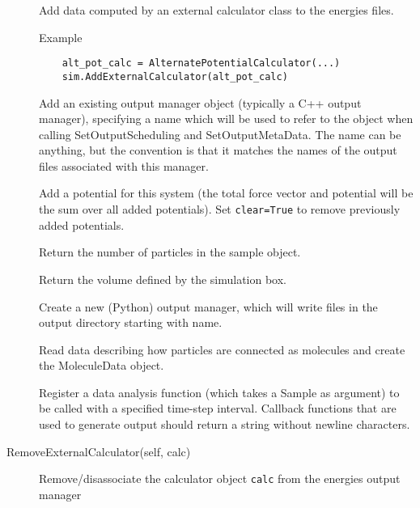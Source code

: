 \documentclass[a4paper]{article}
\begin{document}
\begin{description}
\item[]
  Add data computed by an external calculator class to the energies files.
  
  Example
\begin{verbatim}
    alt_pot_calc = AlternatePotentialCalculator(...)
    sim.AddExternalCalculator(alt_pot_calc)
\end{verbatim}
  

\item[]
  Add an existing output manager object (typically a C++ output
  manager), specifying a name which will be used to refer to the
  object when calling SetOutputScheduling and SetOutputMetaData.
  The name can be anything, but the convention is that it matches
  the names of the output files associated with this manager.

\item[]
  Add a potential for this system
  (the total force vector and potential will be the sum over all
  added potentials). Set \verb|clear=True| to remove previously added potentials.
  

\item[]
  Return the number of particles in the sample object.

\item[]
  Return the volume defined by the simulation box.


\item[]
  Create a new (Python) output manager, which will write files in the
  output directory starting with name.
  
\item[]
  Read data describing how particles are connected as molecules
  and create the MoleculeData object.
  

\item[]
  Register a data analysis function (which takes a Sample as argument)
  to be called with a specified time-step interval. Callback functions
  that are used to generate output should return a string without newline
  characters.

\item[\Q{}RemoveExternalCalculator(self, calc)] Remove/disassociate the calculator object \verb|calc| from the energies output manager
  

\end{description}
\end{document}

